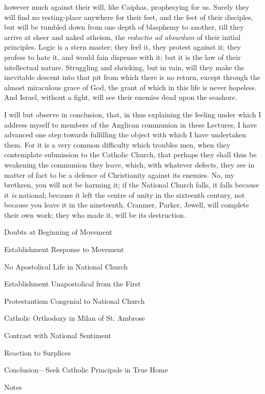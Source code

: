 however much against their will, like Caiphas, prophesying for us.
Surely they will find no resting-place anywhere for their feet, and
the feet of their disciples, but will be tumbled down from one depth
of blasphemy to another, till they arrive at sheer and naked atheism,
the \emph{reductio ad absurdum} of their initial principles. Logic is
a stern master; they feel it, they protest against it; they profess to
hate it, and would fain dispense with it; but it is the law of their
intellectual nature. Struggling and shrieking, but in vain, will they
make the inevitable descent into that pit from which there is no
return, except through the almost miraculous grace of God, the grant
of which in this life is never hopeless. And Israel, without a fight,
will see their enemies dead upon the seashore.

I will but observe in conclusion, that, in thus explaining the
feeling under which I address myself to members of the Anglican
communion in these Lectures, I have advanced one step towards
fulfilling the object with which I have undertaken them. For it is a
very common difficulty which troubles men, when they contemplate
submission to the Catholic Church, that perhaps they shall thus be
weakening the communion they leave, which, with whatever defects, they
see in matter of fact to be a defence of Christianity against its
enemies. No, my brethren, you will not be harming it; if the National
Church falls, it falls because it \emph{is} national; because it left
the centre of unity in the sixteenth century, not because you leave it
in the nineteenth. Cranmer, Parker, Jewell, will complete their own
work; they who made it, will be its destruction.


Doubts at Beginning of Movement

Establishment Response to Movement

No Apostolical Life in National
Church

Establishment Unapostolical
from the First

Protestantism Congenial to
National Church

Catholic Orthodoxy in Milan of St. Ambrose

Contrast with National Sentiment

Reaction to Surplices

Conclusion—Seek Catholic Principals in True Home

Notes

